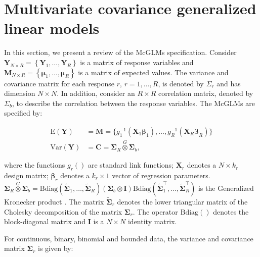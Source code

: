 \documentclass[article]{jss}\usepackage[]{graphicx}\usepackage[]{xcolor}
\begin{document}

\section{Multivariate covariance generalized linear models}\label{sec:mcglm}

In this section, we present a review of the McGLMs specification. Consider $\boldsymbol{Y}_{N \times R} = \left \{ \boldsymbol{Y}_1, \dots, \boldsymbol{Y}_R \right \}$ is a matrix of response variables and $\boldsymbol{M}_{N \times R} = \left \{ \boldsymbol{\mu}_1, \dots, \boldsymbol{\mu}_R \right \}$ is a matrix of expected values. The variance and covariance matrix for each response $r$, $r = 1,..., R$, is denoted by $\Sigma_r$ and has dimension $N \times N$. In addition, consider an $R \times R$ correlation matrix, denoted by $\Sigma_b$, to describe the correlation between the response variables. The McGLMs \citep{Bonat16} are specified by:

$$
      \begin{aligned}
        \mathrm{E}(\boldsymbol{Y}) &=
          \boldsymbol{M} =
            \{g_1^{-1}(\boldsymbol{X}_1 \boldsymbol{\beta}_1),
            \ldots,
            g_R^{-1}(\boldsymbol{X}_R \boldsymbol{\beta}_R)\}
          \\
        \mathrm{Var}(\boldsymbol{Y}) &=
          \boldsymbol{C} =
            \boldsymbol{\Sigma}_R \overset{G} \otimes
            \boldsymbol{\Sigma}_b,
      \end{aligned}
$$

\noindent where the functions $g_r()$ are standard link functions; $\boldsymbol{X}_r$ denotes a $N \times k_r$ design matrix; $\boldsymbol{\beta}_r$ denotes a $k_r \times 1$ vector of regression parameters. $\boldsymbol{\Sigma}_R \overset{G} \otimes \boldsymbol{\Sigma}_b = \mathrm{Bdiag}(\tilde{\boldsymbol{\Sigma}}_1, \ldots, \tilde{\boldsymbol{\Sigma}}_R) (\boldsymbol{\Sigma}_b \otimes \boldsymbol{I}) \mathrm{Bdiag}(\tilde{\boldsymbol{\Sigma}}_1^\top, \ldots, \tilde{\boldsymbol{\Sigma}}_R^\top)$ is the Generalized Kronecker product \citep{martinez13}. The matrix $\tilde{\boldsymbol{\Sigma}}_r$ denotes the lower triangular matrix of the Cholesky decomposition of the matrix ${\boldsymbol{\Sigma}}_r$. The operator $\mathrm{Bdiag()}$ denotes the block-diagonal matrix and $\boldsymbol{I}$ is a $N \times N$ identity matrix. 

For continuous, binary, binomial and bounded data, the variance and covariance matrix $\boldsymbol{\Sigma}_r$ is given by:
\end{document}
